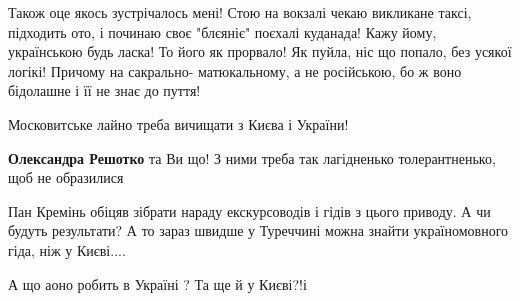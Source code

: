 \begin{itemize}
 

Також оце якось зустрічалось мені! Стою на вокзалі чекаю викликане таксі,
підходить ото, і починаю своє "блєяніє" поєхалі куданада! Кажу йому,
українською будь ласка! То його як прорвало! Як пуйла, ніс що попало, без
усякої логікі! Причому на сакрально- матюкальному, а не російською, бо ж воно
бідолашне і її не знає до пуття!

 
Московитське лайно треба вичищати з Києва і України!

\begin{itemize}
 
\textbf{Олександра Решотко} та Ви що! З ними треба так лагідненько толерантненько, щоб не образилися
\end{itemize}

 

Пан Кремінь обіцяв зібрати нараду екскурсоводів і гідів з цього приводу. А чи
будуть результати? А то зараз швидше у Туреччині можна знайти україномовного
гіда, ніж у Києві....


 

А що аоно робить в Україні ?
Та ще й у Києві?!і

\begin{itemize}
 

\end{itemize}
\end{itemize}
